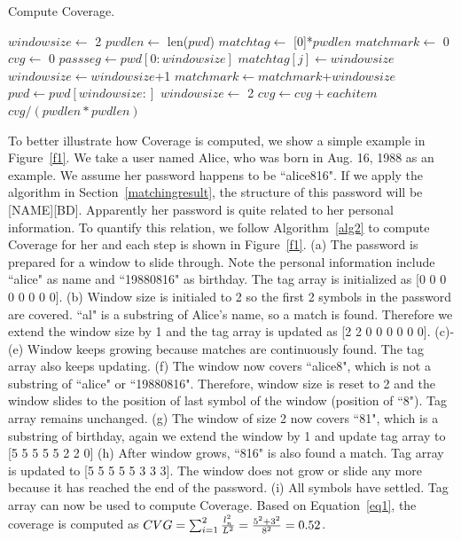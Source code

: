 \begin{algorithm}[!]
\caption{Compute Coverage.}
\label{alg2}
\begin{algorithmic}[1]
\State $windowsize \gets$ 2
\State $pwdlen \gets$ len($pwd$)
\State $matchtag \gets$ [0]*$pwdlen$
\State $matchmark \gets $ 0
\State $cvg \gets $ 0
\State $passseg \gets pwd[0:windowsize]$
\State $matchtag[j] \gets windowsize$
\EndFor
{}
\State $windowsize \gets windowsize$+1
\EndIf
\Else
\State $matchmark \gets matchmark$+$windowsize$
\State $pwd \gets pwd[windowsize:]$
\State $windowsize \gets$ 2
\EndIf
\EndWhile
{}
\State $cvg \gets cvg + eachitem$
\EndFor
\State \Return $cvg/(pwdlen * pwdlen)$
\EndProcedure
\end{algorithmic}
\end{algorithm}

To better illustrate how Coverage is computed, we show a simple example in Figure~\ref{f1}. We take a user named Alice, who was born in Aug. 16, 1988 as an example. We assume her password happens to be ``alice816". If we apply the algorithm in Section~\ref{matchingresult}, the structure of this password will be [NAME][BD]. Apparently her password is quite related to her personal information. To quantify this relation, we follow Algorithm~\ref{alg2} to compute Coverage for her and each step is shown in Figure~\ref{f1}. (a) The password is prepared for a window to slide through. Note the personal information include ``alice" as name and ``19880816" as birthday. The tag array is initialized as [0 0 0 0 0 0 0 0]. (b) Window size is initialed to 2 so the first 2 symbols in the password are covered. ``al" is a substring of Alice's name, so a match is found. Therefore we extend the window size by 1 and the tag array is updated as [2 2 0 0 0 0 0 0]. (c)-(e) Window keeps growing because matches are continuously found. The tag array also keeps updating. (f) The window now covers ``alice8", which is not a substring of ``alice" or ``19880816". Therefore, window size is reset to 2 and the window slides to the position of last symbol of the window (position of ``8"). Tag array remains unchanged. (g) The window of size 2 now covers ``81", which is a substring of birthday, again we extend the window by 1 and update tag array to [5 5 5 5 5 2 2 0] (h) After window grows, ``816" is also found a match. Tag array is updated to [5 5 5 5 5 3 3 3]. The window does not grow or slide any more because it has reached the end of the password. (i) All symbols have settled. Tag array can now be used to compute Coverage. Based on Equation~\ref{eq1}, the coverage is computed as $CVG  = \sum_{i=1}^2 {{l_n^2} \over {L^2}} = {{5^2 + 3^2}\over{8^2}}= 0.52$.

